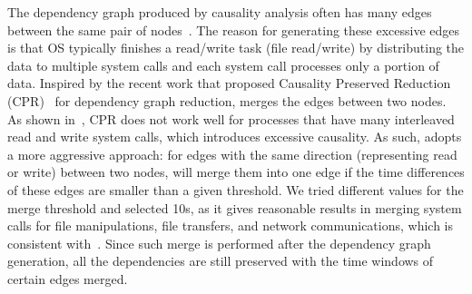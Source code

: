 The dependency graph produced by causality analysis often has many edges between the same pair of nodes~\cite{reduction}.
The reason for generating these excessive edges is that OS typically finishes a read/write task (\eg file read/write) by distributing the data to multiple system calls and each system call processes only a portion of data.
Inspired by the recent work that proposed Causality Preserved Reduction (CPR)~\cite{reduction} for dependency graph reduction, \tool merges the edges between two nodes.
As shown in~\cite{reduction}, CPR does not work well for processes that have many interleaved read and write system calls, which introduces excessive causality.
As such, \tool adopts a more aggressive approach: for edges with the same direction (\ie representing read or write) between two nodes, 
\tool will merge them into one edge if the time differences of these edges are smaller than a given threshold. 
We tried different values for the merge threshold and selected 10s, as it gives reasonable results in merging system calls for file manipulations, file transfers, and network communications, which is consistent with~\cite{reduction}.
Since such merge is performed after the dependency graph generation, all the dependencies are still preserved with the time windows of certain edges merged.






